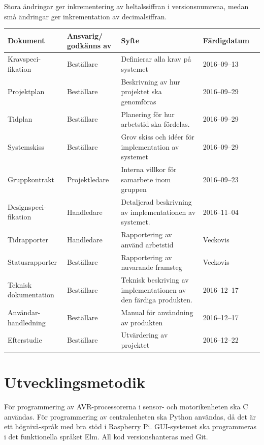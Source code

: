 \documentclass[a4paper,titlepage,12pt]{article}
\begin{document}
	Stora ändringar ger inkrementering av heltalssiffran i versionsnumrena,
	medan små ändringar ger inkrementation av decimalsiffran.
	
	\begin{longtable}[l]{ p{3cm} p{3cm} >{\raggedright}p{5cm} p{2.2cm} l }
		\textbf{Dokument} & \textbf{Ansvarig/ godkänns av} & \textbf{Syfte} & \textbf{Färdigdatum} \\ \midrule
		
		Kravspeci-fikation & Beställare & Definierar alla krav på systemet & 2016--09--13 \\ \midrule

		Projektplan & Beställare & Beskrivning av hur projektet ska genomföras & 2016--09--29 \\ \midrule

		Tidplan & Beställare & Planering för hur arbetstid ska fördelas. & 2016--09--29  \\ \midrule
		
		Systemskiss & Beställare & Grov skiss och idéer för implementation av systemet & 2016--09--29 \\ \midrule

        Gruppkontrakt & Projektledare & Interna villkor för samarbete inom
        gruppen & 2016--09--23 \\ \midrule

		Designspeci-fikation & Handledare & Detaljerad beskrivning av implementationen av systemet. & 2016--11--04 \\ \midrule

		Tidrapporter & Handledare & Rapportering av använd arbetstid & Veckovis		\\ \midrule

		Statusrapporter & Beställare & Rapportering av nuvarande framsteg & Veckovis \\ \midrule

		Teknisk dokumentation & Beställare & Teknisk beskriving av
		implementationen av den färdiga produkten. & 2016--12--17 \\ \midrule

		Användar-handledning & Beställare & Manual för användning av produkten & 2016--12--17 \\ \midrule

		Efterstudie & Beställare & Utvärdering av projektet & 2016--12--22  \\ \midrule
	\end{longtable}
	
	
	\section{Utvecklingsmetodik}
	För programmering av AVR-processorerna i sensor- och motorikenheten ska C
	användas. För programmering av centralenheten ska Python användas, då det
	är ett högnivå-språk med bra stöd i Raspberry Pi. GUI-systemet ska
	programmeras i det funktionella språket Elm. All kod versionshanteras med Git.
	
\end{document}
